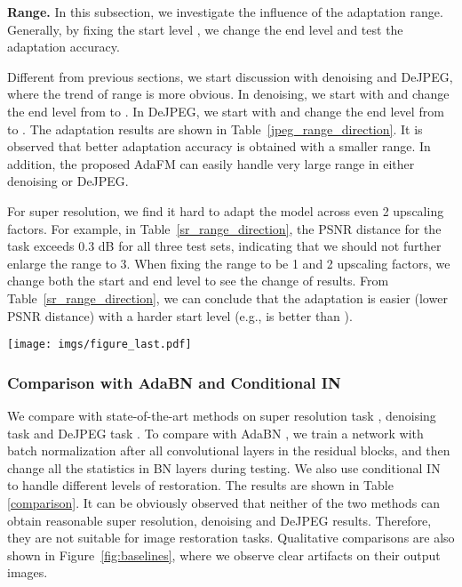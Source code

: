 \documentclass[10pt,twocolumn,letterpaper]{article}
\begin{document}
\textbf{Range.}
In this subsection, we investigate the influence of the adaptation range. Generally, by fixing the start level , we change the end level  and test the adaptation accuracy. 

Different from previous sections, we start discussion with denoising and DeJPEG, where the trend of range is more obvious. In denoising, we start with  and change the end level from  to . In DeJPEG, we start with  and change the end level from  to . The adaptation results are shown in Table~\ref{jpeg_range_direction}. It is observed that better adaptation accuracy is obtained with a smaller range.
In addition, the proposed AdaFM can easily handle very large range in either denoising or DeJPEG.

For super resolution, we find it hard to adapt the model across even 2 upscaling factors. For example, in Table~\ref{sr_range_direction}, the PSNR distance for the task  exceeds 0.3 dB for all three test sets, indicating that we should not further enlarge the range to 3. When fixing the range to be 1 and 2 upscaling factors, we change both the start and end level to see the change of results. From Table~\ref{sr_range_direction}, we can conclude that the adaptation is easier (lower PSNR distance) with a harder start level (e.g.,  is better than ).

\begin{figure*}
	\centering
	\vspace{-2em}
	\texttt{[image: imgs/figure\_last.pdf]}
	\vspace{-1em}
	\caption{Left: Artifacts on the output images produced by AdaBN and conditional instance normalization. Right: Modulation testing in Denoising (CBSD68), DeJEPG (LIVE1) and Super Resolution (Set14 \cite{zeyde2010single}).}
	\vspace{-1.5em}
	\label{fig:baselines}
\end{figure*}

\vspace{-0.7em}
\subsubsection{Comparison with AdaBN and Conditional IN}
\quad We compare with state-of-the-art methods on super resolution task , denoising task  and DeJPEG task . To compare with AdaBN \cite{Li2017RevisitingBN}, we train a network with batch normalization after all convolutional layers in the residual blocks, and then change all the statistics in BN layers during testing. We also use conditional IN \cite{huang2017arbitrary} to handle different levels of restoration. The results are shown in Table \ref{comparison}.
It can be obviously observed that neither of the two methods can obtain reasonable super resolution, denoising and DeJPEG results. Therefore, they are not suitable for image restoration tasks. Qualitative comparisons are also shown in Figure~\ref{fig:baselines}, where we observe clear artifacts on their output images.
\end{document}
